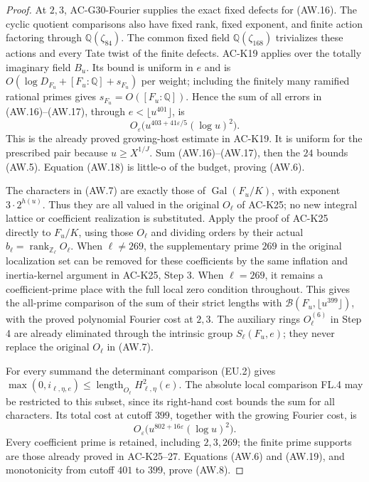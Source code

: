 \begin{proof}
At $2,3$, AC-G30-Fourier supplies the exact fixed defects for
(AW.16).  The cyclic quotient comparisons also have fixed rank,
fixed exponent, and finite action factoring through
$\mathbb Q(\zeta_{84})$.
The common fixed field $\mathbb Q(\zeta_{168})$ trivializes
these actions and every Tate twist of the finite defects.
AC-K19 applies over the totally imaginary field $B_u$.
Its bound is uniform in $e$ and is
$O(\log D_{F_u}+[F_u:\mathbb Q]+s_{F_u})$ per weight;
including the finitely many ramified rational primes gives
$s_{F_u}=O([F_u:\mathbb Q])$.
Hence the sum of all errors in (AW.16)--(AW.17), through
$e<\lfloor u^{401}\rfloor$, is
\[
 O_\varepsilon\bigl(u^{403+41\varepsilon/5}(\log u)^2\bigr).
                                                                    \tag{AW.18}
\]
This is the already proved growing-host estimate in AC-K19.
It is uniform for the prescribed pair because $u\geq X^{1/J}$.
Sum (AW.16)--(AW.17), then the $24$ bounds (AW.5).
Equation (AW.18) is little-o of the budget, proving (AW.6).

The characters in (AW.7) are exactly those of
$\operatorname{Gal}(F_u/K)$, with exponent $3\cdot2^{h(u)}$.
Thus they are all valued in the original $O_\ell$ of AC-K25;
no new integral lattice or coefficient realization is substituted.
Apply the proof of AC-K25 directly to $F_u/K$, using those
$O_\ell$ and dividing orders by their actual
$b_\ell=\operatorname{rank}_{\mathbb Z_\ell}O_\ell$.
When $\ell\ne269$, the supplementary prime $269$ in the original
localization set can be removed for these coefficients by the
same inflation and inertia-kernel argument in AC-K25, Step 3.
When $\ell=269$, it remains a coefficient-prime place with the
full local zero condition throughout.
This gives the all-prime comparison of the sum of their strict
lengths with $\mathcal B(F_u,\lfloor u^{399}\rfloor)$,
with the proved polynomial Fourier cost at $2,3$.
The auxiliary rings $O^{(6)}_\ell$ in Step 4 are already
eliminated through the intrinsic group $S_\ell(F_u,e)$;
they never replace the original $O_\ell$ in (AW.7).

For every summand the determinant comparison (EU.2) gives
$\max(0,i_{\ell,\eta,e})\leq
\operatorname{length}_{O_\ell}H^2_{\ell,\eta}(e)$.
The absolute local comparison FL.4 may be restricted to this
subset, since its right-hand cost bounds the sum for all
characters.  Its total cost at cutoff $399$, together with the
growing Fourier cost, is
\[
 O_\varepsilon\bigl(u^{802+16\varepsilon}(\log u)^2\bigr).
                                                                    \tag{AW.19}
\]
Every coefficient prime is retained, including $2,3,269$;
the finite prime supports are those already proved in
AC-K25--27.  Equations (AW.6) and (AW.19), and monotonicity
from cutoff $401$ to $399$, prove (AW.8).
\end{proof}

